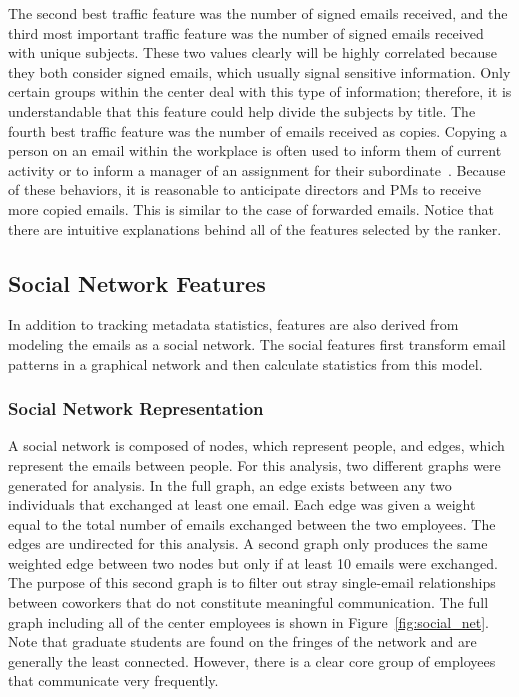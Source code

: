 \documentclass[12pt]{report}
\begin{document}
The second best traffic feature was the number of signed emails received, and the third most important traffic feature was the number of signed emails received with unique subjects.
These two values clearly will be highly correlated because they both consider signed emails, which usually signal sensitive information.
Only certain groups within the center deal with this type of information; therefore, it is understandable that this feature could help divide the subjects by title.
The fourth best traffic feature was the number of emails received as copies.
Copying a person on an email within the workplace is often used to inform them of current activity or to inform a manager of an assignment for their subordinate~\cite{skovholt2006email}.
Because of these behaviors, it is reasonable to anticipate directors and PMs to receive more copied emails.
This is similar to the case of forwarded emails.
Notice that there are intuitive explanations behind all of the features selected by the ranker.


\subsection{Social Network Features}
In addition to tracking metadata statistics, features are also derived from modeling the emails as a social network.
The social features first transform email patterns in a graphical network and then calculate statistics from this model.


\subsubsection{Social Network Representation}
A social network is composed of nodes, which represent people, and edges, which represent the emails between people.
For this analysis, two different graphs were generated for analysis.
In the full graph, an edge exists between any two individuals that exchanged at least one email.
Each edge was given a weight equal to the total number of emails exchanged between the two employees.
The edges are undirected for this analysis.
A second graph only produces the same weighted edge between two nodes but only if at least 10 emails were exchanged.
The purpose of this second graph is to filter out stray single-email relationships between coworkers that do not constitute meaningful communication.
The full graph including all of the center employees is shown in Figure~\ref{fig:social_net}.  Note that graduate students are found on the fringes of the network and are generally the least connected.  However, there is a clear core group of employees that communicate very frequently.
\end{document}
